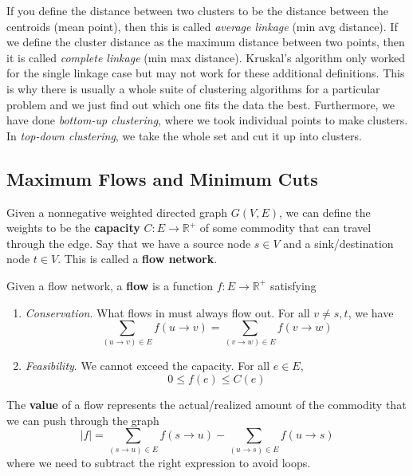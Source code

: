   If you define the distance between two clusters to be the distance between the centroids (mean point), then this is called \textit{average linkage} (min avg distance). If we define the cluster distance as the maximum distance between two points, then it is called \textit{complete linkage} (min max distance). Kruskal's algorithm only worked for the single linkage case but may not work for these additional definitions. This is why there is usually a whole suite of clustering algorithms for a particular problem and we just find out which one fits the data the best. Furthermore, we have done \textit{bottom-up clustering}, where we took individual points to make clusters. In \textit{top-down clustering}, we take the whole set and cut it up into clusters.  

\subsection{Maximum Flows and Minimum Cuts} 

    \begin{definition}
      Given a nonnegative weighted directed graph $G(V, E)$, we can define the weights to be the \textbf{capacity} $C: E \rightarrow \mathbb{R}^+$ of some commodity that can travel through the edge. Say that we have a source node $s \in V$ and a sink/destination node $t \in V$. This is called a \textbf{flow network}.
    \end{definition}

    \begin{definition}[Flow]
      Given a flow network, a \textbf{flow} is a function $f: E \rightarrow \mathbb{R}^+$ satisfying 
      \begin{enumerate}
        \item \textit{Conservation}. What flows in must always flow out. For all $v \neq s, t$, we have 
          \begin{equation}
            \sum_{(u \rightarrow v) \in E} f(u \rightarrow v) = \sum_{(v \rightarrow w) \in E} f(v \rightarrow w)
          \end{equation}

        \item \textit{Feasibility}. We cannot exceed the capacity. For all $e \in E$, 
          \begin{equation}
            0 \leq f(e) \leq C(e)
          \end{equation}
      \end{enumerate}
      The \textbf{value} of a flow represents the actual/realized amount of the commodity that we can push through the graph
      \begin{equation}
        |f| = \sum_{(s \rightarrow u) \in E}  f(s \rightarrow u) - \sum_{(u \rightarrow s) \in E}  f(u \rightarrow s) 
      \end{equation} 
      where we need to subtract the right expression to avoid loops. 
    \end{definition}

